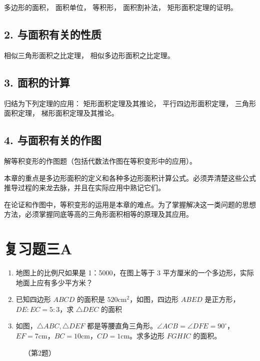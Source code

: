 多边形的面积， 面积单位， 等积形， 面积割补法， 矩形面积定理的证明。

\subsection{2.
与面积有关的性质}

相似三角形面积之比定理， 相似多边形面积之比定理。

\subsection{3. 面积的计算}

归结为下列定理的应用： 矩形面积定理及其推论， 平行四边形面积定理，
三角形面积定理， 梯形面积定理及其推论。

\subsection{4.
与面积有关的作图}

解等积变形的作图题（包括代数法作图在等积变形中的应用）。

本章的重点是多边形面积的定义和各种多边形面积计算公式。必须弄清楚这些公式推导过程的来龙去脉，并且在实际应用中熟记它们。

在论证和作图中，等积变形的运用是本章的难点。为了掌握解决这一类问题的思想方法，必须掌握同底等高的三角形面积相等的原理及其应用。

\section{复习题三A}

\begin{enumerate}
\item
  地图上的比例尺如果是 1：5000，在图上等于 3
  平方厘米的一个多边形，实际地面上应有多少平方米？
\item
  已知四边形 \(ABCD\) 的面积是 \(520\mathrm{cm}^2\)，如图，四边形
  \(ABED\) 是正方形，\(DE:EC=5:3\)，求 \(\triangle DEC\) 的面积
\item
  如图，\(\triangle ABC, \triangle DEF\)
  都是等腰直角三角形。\(\angle ACB = \angle DFE = 90^\circ\)，\(EF = 7\mathrm{cm}\)，\(BC = 10\mathrm{cm}\)，\(CD = 1\mathrm{cm}\)。求多边形
  \(FGHIC\) 的面积。
\end{enumerate}

\begin{figure}
\centering
{}
\caption{（第2题）}
\end{figure}

